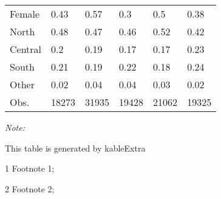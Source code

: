 \begin{table}
\begin{threeparttable}
\begin{tabular}[t]{llllll}
\hspace{1em}Female & 0.43 & 0.57 & 0.3 & 0.5 & 0.38\\
\hspace{1em}North & 0.48 & 0.47 & 0.46 & 0.52 & 0.42\\
\hspace{1em}Central & 0.2 & 0.19 & 0.17 & 0.17 & 0.23\\
\hspace{1em}South & 0.21 & 0.19 & 0.22 & 0.18 & 0.24\\
\hspace{1em}Other & 0.02 & 0.04 & 0.04 & 0.03 & 0.02\\
Obs. & 18273 & 31935 & 19428 & 21062 & 19325\\
\bottomrule
\end{tabular}
\begin{tablenotes}
\item \textit{Note: } 
\item This table is generated by kableExtra
\item[1] Footnote 1; 
\item[2] Footnote 2; 
\end{tablenotes}
\end{threeparttable}
\end{table}

